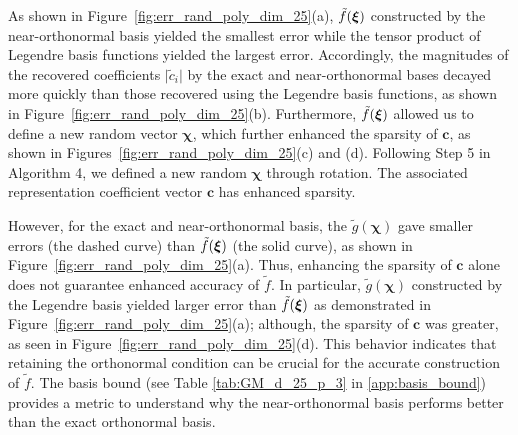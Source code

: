 As shown in Figure~\ref{fig:err_rand_poly_dim_25}(a), $\tilde{f}(\bm\xi)$ constructed by the near-orthonormal 
basis yielded the smallest error while the tensor product of Legendre basis functions yielded the largest error.
Accordingly, the magnitudes of the recovered coefficients $\vert \tilde{c}_i \vert$ by the exact and near-orthonormal bases decayed more quickly than those recovered using the Legendre basis functions, as shown in Figure~\ref{fig:err_rand_poly_dim_25}(b).
Furthermore, $\tilde{f}(\bm\xi)$ allowed us to define a new random vector $\bm\chi$, which further enhanced the sparsity of $\bm c$, as shown in Figures~\ref{fig:err_rand_poly_dim_25}(c) and (d).
Following Step 5 in Algorithm 4, we defined a new random $\bm\chi$ through rotation. The associated representation
coefficient vector $\bm c$ has enhanced sparsity.

However, for the exact and near-orthonormal basis, the $\tilde{g}(\bm\chi)$ gave smaller errors (the dashed curve) than $\tilde{f}(\bm\xi)$ (the solid curve), as shown in Figure~\ref{fig:err_rand_poly_dim_25}(a).
Thus, enhancing the sparsity of $\bm c$ alone does not guarantee enhanced accuracy of $\tilde{f}$.
In particular, $\tilde{g}(\bm\chi)$ constructed by the Legendre basis yielded larger error than $\tilde{f}(\bm\xi)$ as demonstrated in Figure~\ref{fig:err_rand_poly_dim_25}(a); although, the sparsity of $\bm c$ was greater, as seen in Figure~\ref{fig:err_rand_poly_dim_25}(d).
This behavior indicates that retaining the orthonormal condition can be crucial for the accurate construction of $\tilde{f}$. {The basis bound (see Table \ref{tab:GM_d_25_p_3} in \ref{app:basis_bound}) provides a metric to understand why the near-orthonormal basis performs better than the exact orthonormal basis.}


